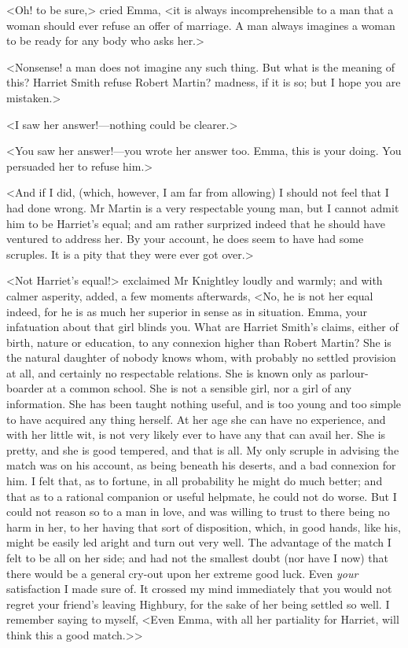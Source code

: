 <Oh! to be sure,> cried Emma, <it is always incomprehensible to a man that a woman should ever refuse an offer of marriage. A man always imagines a woman to be ready for any body who asks her.>

<Nonsense! a man does not imagine any such thing. But what is the meaning of this? Harriet Smith refuse Robert Martin? madness, if it is so; but I hope you are mistaken.>

<I saw her answer!—nothing could be clearer.>

<You saw her answer!—you wrote her answer too. Emma, this is your doing. You persuaded her to refuse him.>

<And if I did, (which, however, I am far from allowing) I should not feel that I had done wrong. Mr Martin is a very respectable young man, but I cannot admit him to be Harriet's equal; and am rather surprized indeed that he should have ventured to address her. By your account, he does seem to have had some scruples. It is a pity that they were ever got over.>

<Not Harriet's equal!> exclaimed Mr Knightley loudly and warmly; and with calmer asperity, added, a few moments afterwards, <No, he is not her equal indeed, for he is as much her superior in sense as in situation. Emma, your infatuation about that girl blinds you. What are Harriet Smith's claims, either of birth, nature or education, to any connexion higher than Robert Martin? She is the natural daughter of nobody knows whom, with probably no settled provision at all, and certainly no respectable relations. She is known only as parlour-boarder at a common school. She is not a sensible girl, nor a girl of any information. She has been taught nothing useful, and is too young and too simple to have acquired any thing herself. At her age she can have no experience, and with her little wit, is not very likely ever to have any that can avail her. She is pretty, and she is good tempered, and that is all. My only scruple in advising the match was on his account, as being beneath his deserts, and a bad connexion for him. I felt that, as to fortune, in all probability he might do much better; and that as to a rational companion or useful helpmate, he could not do worse. But I could not reason so to a man in love, and was willing to trust to there being no harm in her, to her having that sort of disposition, which, in good hands, like his, might be easily led aright and turn out very well. The advantage of the match I felt to be all on her side; and had not the smallest doubt (nor have I now) that there would be a general cry-out upon her extreme good luck. Even \textit{your} satisfaction I made sure of. It crossed my mind immediately that you would not regret your friend's leaving Highbury, for the sake of her being settled so well. I remember saying to myself, <Even Emma, with all her partiality for Harriet, will think this a good match.>>

